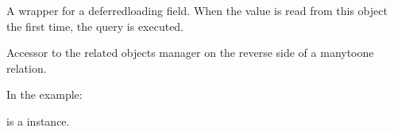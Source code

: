 \documentclass[letterpaper,10pt,english]{sphinxmanual}
\begin{document}
\begin{fulllineitems}

\begin{fulllineitems}
\label{\detokenize{pages_app.models:id4}}
\pysigstartsignatures
\pysigline
{}
\pysigstopsignatures
\sphinxAtStartPar
A wrapper for a deferred\sphinxhyphen{}loading field. When the value is read from this
object the first time, the query is executed.

\end{fulllineitems}


\begin{fulllineitems}
\label{\detokenize{pages_app.models:pages_app.models.block.Block.objects}}
\pysigstartsignatures
\pysigline
{}
\pysigstopsignatures
\end{fulllineitems}


\begin{fulllineitems}
\label{\detokenize{pages_app.models:pages_app.models.block.Block.pageblock_set}}
\pysigstartsignatures
\pysigline
{}
\pysigstopsignatures
\sphinxAtStartPar
Accessor to the related objects manager on the reverse side of a
many\sphinxhyphen{}to\sphinxhyphen{}one relation.

\sphinxAtStartPar
In the example:

\begin{sphinxVerbatim}[commandchars=\\\{\}]
 
       
\end{sphinxVerbatim}

\sphinxAtStartPar
{} is a  instance.


\end{fulllineitems}
\end{fulllineitems}
\end{document}
